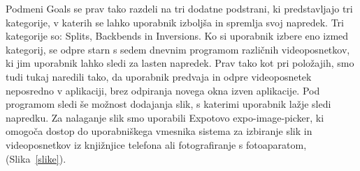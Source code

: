 \documentclass[a4paper, 12pt]{book}
\begin{document}
Podmeni Goals se prav tako razdeli na tri dodatne podstrani, ki predstavljajo tri kategorije, v katerih se lahko uporabnik izboljša in spremlja svoj napredek. Tri kategorije so: Splits, Backbends in Inversions. Ko si uporabnik izbere eno izmed kategorij, se odpre starn s sedem dnevnim programom različnih videoposnetkov, ki jim uporabnik lahko sledi za lasten napredek. Prav tako kot pri položajih, smo tudi tukaj naredili tako, da uporabnik predvaja in odpre videoposnetek neposredno v aplikaciji, brez odpiranja novega okna izven aplikacije. Pod programom sledi še možnost dodajanja slik, s katerimi uporabnik lažje sledi napredku. Za nalaganje slik smo uporabili Expotovo expo-image-picker, ki omogoča dostop do uporabniškega vmesnika sistema za izbiranje slik in videoposnetkov iz knjižnjice telefona ali fotografiranje s fotoaparatom, (Slika~\ref{slike}).
\end{document}

